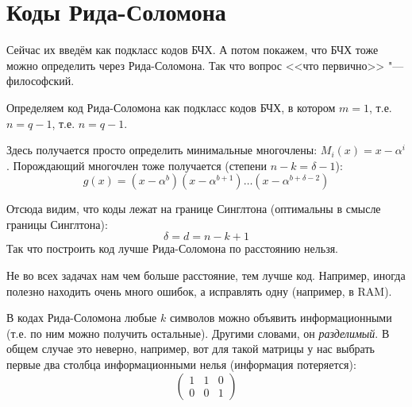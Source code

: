 \section{Коды Рида-Соломона}
Сейчас их введём как подкласс кодов БЧХ.
А потом покажем, что БЧХ тоже можно определить через Рида-Соломона.
Так что вопрос <<что первично>> "--- философский.

Определяем код Рида-Соломона как подкласс кодов БЧХ,
в котором $m=1$, т.е. $n=q-1$, т.е. $n=q-1$.

Здесь получается просто определить минимальные
многочлены: $M_i(x)=x - \alpha^i$.
Порождающий многочлен тоже получается (степени $n-k=\delta-1$):
\[
g(x) = (x-\alpha^b)(x-\alpha^{b+1})\dots(x-\alpha^{b+\delta-2})
\]

Отсюда видим, что коды лежат на границе Синглтона
(оптимальны в смысле границы Синглтона):
\[
\delta = d = n - k + 1
\]
Так что построить код лучше Рида-Соломона по расстоянию нельзя.
\begin{Rem}
	Не во всех задачах нам чем больше расстояние, тем лучше код.
	Например, иногда полезно находить очень много ошибок, а
	исправлять одну (например, в RAM).
\end{Rem}
\begin{Rem}
	В кодах Рида-Соломона любые $k$ символов можно объявить
	информационными (т.е. по ним можно получить остальные).
	Другими словами, он \textit{разделимый}.
	В общем случае это неверно, например, вот для такой
	матрицы у нас выбрать первые два столбца информационными нелья
	(информация потеряется):
	\[
	\begin{pmatrix}
	1 & 1 & 0 \\
	0 & 0 & 1
	\end{pmatrix}
	\]
\end{Rem}

